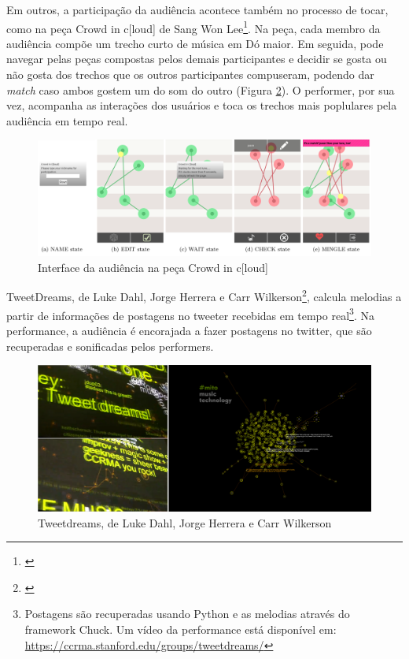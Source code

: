 Em outros, a participação da audiência acontece também no processo de tocar, como na peça Crowd in c[loud] de Sang Won Lee\footnote{\cite{Lee2016}}. Na peça, cada membro da audiência compõe um trecho curto de música em Dó maior. Em seguida, pode navegar pelas peças compostas pelos demais participantes e decidir se gosta ou não gosta dos trechos que os outros participantes compuseram, podendo dar \emph{match} caso ambos gostem um do som do outro (Figura \ref{crowdincloud}). O performer, por sua vez, acompanha as interações dos usuários e toca os trechos mais poplulares pela audiência em tempo real.

\begin{figure}
    \caption{\label{crowdincloud}Interface da audiência na peça Crowd in c[loud]}
    \begin{center}
        \includegraphics[width=1\linewidth]{pictures/cap3/crowdincloud}
    \end{center}
\end{figure}

TweetDreams, de Luke Dahl, Jorge Herrera e Carr Wilkerson\footnote{\cite{Dahl2011}}, calcula melodias a partir de informações de postagens no tweeter recebidas em tempo real\footnote{Postagens são recuperadas usando Python e as melodias através do framework Chuck. Um vídeo da performance está disponível em: \url{https://ccrma.stanford.edu/groups/tweetdreams/}}. Na performance, a audiência é encorajada a fazer postagens no twitter, que são recuperadas e sonificadas pelos performers. 


\begin{figure}
    \caption{\label{crowdincloud}Tweetdreams, de Luke Dahl, Jorge Herrera e Carr Wilkerson}
    \begin{center}
        \includegraphics[width=1\linewidth]{pictures/cap3/tweetdreams}
    \end{center}
\end{figure}


